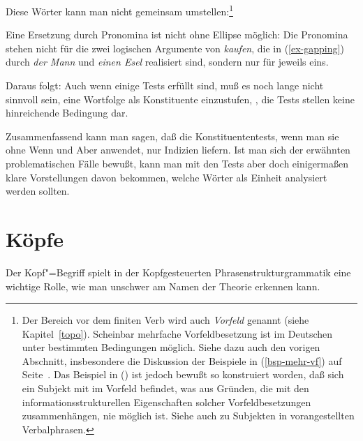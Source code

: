Diese Wörter kann man nicht gemeinsam umstellen:\footnote{
  Der Bereich vor dem finiten Verb wird auch \emph{Vorfeld} genannt (siehe Kapitel~\ref{topo}).
  Scheinbar mehrfache Vorfeldbesetzung ist im Deutschen unter bestimmten
  Bedingungen möglich. Siehe dazu auch den vorigen Abschnitt, insbesondere
  die Diskussion der Beispiele in (\ref{bsp-mehr-vf}) auf Seite~\pageref{bsp-mehr-vf}.
  Das Beispiel in () ist jedoch bewußt so konstruiert worden, 
  daß sich ein Subjekt mit im Vorfeld befindet, was aus Gründen, die 
  mit den informationsstrukturellen Eigenschaften solcher Vorfeldbesetzungen
  zusammenhängen, nie möglich ist. Siehe auch  zu Subjekten
  in vorangestellten Verbalphrasen.%
}
\z

Eine Ersetzung durch Pronomina ist nicht ohne Ellipse möglich:
\eal
{}
\zl
Die Pronomina stehen nicht für die zwei logischen Argumente von \emph{kaufen}, die
in (\ref{ex-gapping})  \zb durch \emph{der Mann} und \emph{einen Esel} realisiert sind,
sondern nur für jeweils eins.

Daraus folgt: Auch wenn einige Tests erfüllt sind, muß es noch lange nicht sinnvoll sein,
eine Wortfolge als Konstituente einzustufen, \dash, die Tests stellen keine hinreichende
Bedingung dar.



Zusammenfassend kann man sagen, daß die Konstituententests, wenn man sie ohne Wenn und Aber
anwendet, nur Indizien liefern. Ist man sich der erwähnten problematischen Fälle bewußt,
kann man mit den Tests aber doch einigermaßen klare Vorstellungen davon bekommen, welche
Wörter als Einheit analysiert werden sollten.

\section{Köpfe}

Der Kopf"=Begriff spielt in der Kopfgesteuerten Phrasenstrukturgrammatik
eine wichtige Rolle, wie man unschwer am Namen der Theorie erkennen kann.

